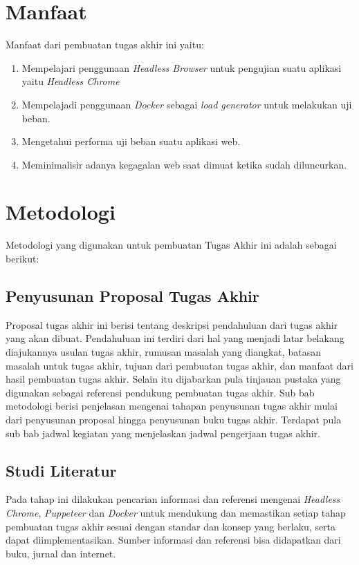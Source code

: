 	\section{Manfaat}
		Manfaat dari pembuatan tugas akhir ini yaitu:
		\begin{enumerate}
			\item Mempelajari penggunaan \textit{Headless Browser} untuk pengujian suatu aplikasi yaitu \textit{Headless Chrome}
			\item Mempelajadi penggunaan \textit{Docker} sebagai \textit{load generator} untuk melakukan uji beban.
			\item Mengetahui performa uji beban suatu aplikasi web.
			\item Meminimalisir adanya kegagalan web saat dimuat ketika sudah diluncurkan.
		\end{enumerate}
	
	\section{Metodologi}
		Metodologi yang digunakan untuk pembuatan Tugas Akhir ini adalah sebagai berikut:	
		\subsection{Penyusunan Proposal Tugas Akhir}
			Proposal tugas akhir ini berisi tentang deskripsi pendahuluan dari tugas
			akhir yang akan dibuat. Pendahuluan ini terdiri dari hal yang menjadi latar
			belakang diajukannya usulan tugas akhir, rumusan masalah yang diangkat,
			batasan masalah untuk tugas akhir, tujuan dari pembuatan tugas akhir, dan
			manfaat dari hasil pembuatan tugas akhir. Selain itu dijabarkan pula tinjauan
			pustaka yang digunakan sebagai referensi pendukung pembuatan tugas akhir.
			Sub bab metodologi berisi penjelasan mengenai tahapan penyusunan tugas
			akhir mulai dari penyusunan proposal hingga penyusunan buku tugas akhir.
			Terdapat pula sub bab jadwal kegiatan yang menjelaskan jadwal pengerjaan
			tugas akhir.	
		\subsection{Studi Literatur}
			Pada tahap ini dilakukan pencarian informasi dan referensi mengenai \textit{Headless Chrome}, \textit{Puppeteer} dan \textit{Docker} untuk mendukung dan memastikan setiap tahap pembuatan tugas akhir sesuai dengan standar dan konsep yang berlaku, serta dapat diimplementasikan. Sumber informasi dan referensi bisa didapatkan dari buku, jurnal dan internet.

